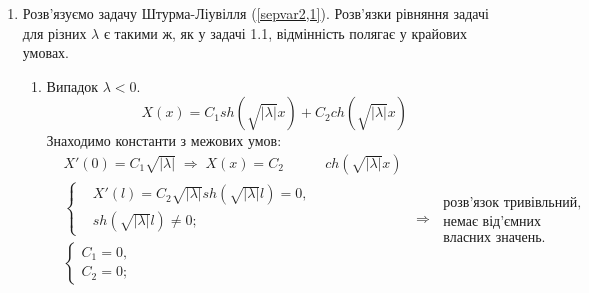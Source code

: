 \begin{enumerate}
    \item[] Розв'язуємо задачу Штурма-Ліувілля (\ref{sepvar2,1}). Розв'язки рівняння задачі для різних $\lambda$ є такими ж, як у задачі 1.1, відмінність полягає у крайових умовах.
    \begin{enumerate}[wide, labelindent=0pt]
        
        \item Випадок $\lambda < 0$. 
        \begin{equation*}
            X(x) = C_1 sh(\sqrt{|\lambda|}x) + C_2 ch({\sqrt{|\lambda|}x})
        \end{equation*}
        Знаходимо константи з межових умов:
        \begin{equation*}
            \begin{aligned}
                &X'(0) = C_1\sqrt{|\lambda|}
                \;\Rightarrow\;
                X(x) = C_2 &ch(\sqrt{|\lambda|}x)\\
                &\left\{ \begin{aligned}
                    &X'(l) = C_2\sqrt{|\lambda|} sh(\sqrt{|\lambda|}l) = 0, \\
                    &sh(\sqrt{|\lambda|}l) \neq 0;
                \end{aligned} \right.&\\
                &\left\{ \begin{aligned}
                    C_1 = 0, \\ 
                    C_2 = 0;
                \end{aligned} \right. \qquad\qquad\qquad\qquad&
            \end{aligned}
            \;\Rightarrow\;
            \begin{aligned}
                \text{розв'язок тривівльний,}\\
                \text{немає від'ємних}\\
                \text{власних значень.}
            \end{aligned}
        \end{equation*}


\end{enumerate}
\end{enumerate}
